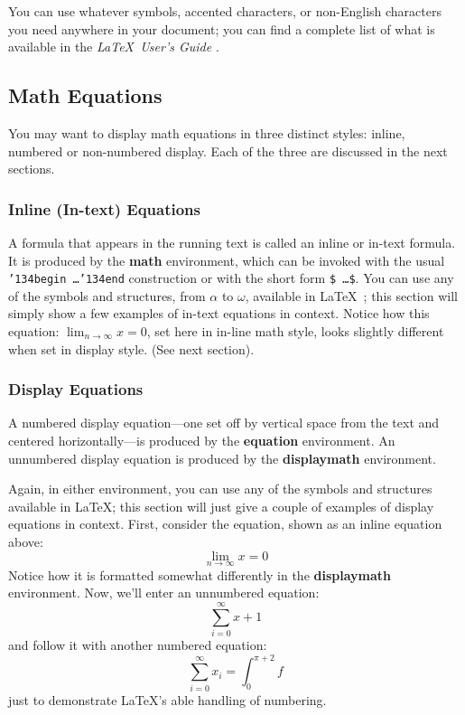 You can use whatever symbols, accented characters, or non-English
characters you need anywhere in your document; you can find a complete
list of what is available in the \textit{\LaTeX\ User's Guide}
\cite{Lamport:LaTeX}.

\subsection{Math Equations}
You may want to display math equations in three distinct styles:
inline, numbered or non-numbered display.  Each of
the three are discussed in the next sections.

\subsubsection{Inline (In-text) Equations}
A formula that appears in the running text is called an
inline or in-text formula.  It is produced by the
\textbf{math} environment, which can be
invoked with the usual \texttt{{\char'134}begin\,\ldots{\char'134}end}
construction or with the short form \texttt{\$\,\ldots\$}. You
can use any of the symbols and structures,
from $\alpha$ to $\omega$, available in
\LaTeX~\cite{Lamport:LaTeX}; this section will simply show a
few examples of in-text equations in context. Notice how
this equation:
\begin{math}
  \lim_{n\rightarrow \infty}x=0
\end{math},
set here in in-line math style, looks slightly different when
set in display style.  (See next section).

\subsubsection{Display Equations}
A numbered display equation---one set off by vertical space from the
text and centered horizontally---is produced by the \textbf{equation}
environment. An unnumbered display equation is produced by the
\textbf{displaymath} environment.

Again, in either environment, you can use any of the symbols
and structures available in \LaTeX\@; this section will just
give a couple of examples of display equations in context.
First, consider the equation, shown as an inline equation above:
\begin{equation}
  \lim_{n\rightarrow \infty}x=0
\end{equation}
Notice how it is formatted somewhat differently in
the \textbf{displaymath}
environment.  Now, we'll enter an unnumbered equation:
\begin{displaymath}
  \sum_{i=0}^{\infty} x + 1
\end{displaymath}
and follow it with another numbered equation:
\begin{equation}
  \sum_{i=0}^{\infty}x_i=\int_{0}^{\pi+2} f
\end{equation}
just to demonstrate \LaTeX's able handling of numbering.


